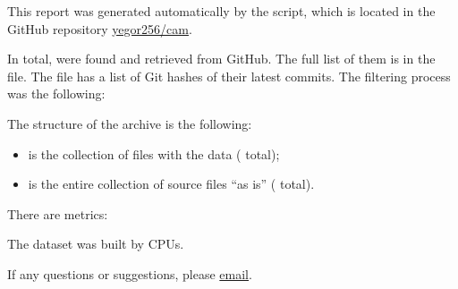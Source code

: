 \documentclass[nobrand,nosecurity]{huawei}
\begin{document}
\maketitle

This report was generated automatically by the script, which is located in
the GitHub repository \href{https://github.com/yegor256/cam}{yegor256/cam}.

In total, \unskip{}
were found and retrieved from GitHub.
The full list of them is in the  file.
The  file has a list of Git hashes of their latest commits.
The filtering process was the following:

\begin{enumerate}
\unskip{}
\end{enumerate}

The structure of the archive is the following:

\begin{itemize}

  \item {} is the collection of  files with the data
  (\unskip{} total);

  \item {} is the entire collection of
  \unskip{}
  source files ``as is''
  (\unskip{} total).

\end{itemize}

There are \unskip{} metrics:

\begin{itemize}
  
\end{itemize}

The dataset was built by
\unskip{}
CPUs\unskip{}.

If any questions or suggestions, please \href{mailto:yegor256@gmail.com}{email}.
\end{document}
